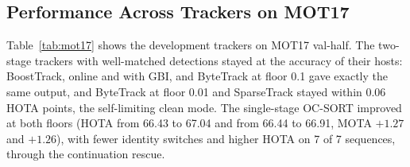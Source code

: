 \documentclass[pdflatex,sn-mathphys-num,iicol]{sn-jnl}
\begin{document}
\subsection{Performance Across Trackers on MOT17}\label{sec:tracker}
Table~\ref{tab:mot17} shows the development trackers on MOT17 val-half. The two-stage trackers with
well-matched detections stayed at the accuracy of their hosts: BoostTrack, online and with GBI, and
ByteTrack at floor 0.1 gave exactly the same output, and ByteTrack at floor 0.01 and SparseTrack
stayed within 0.06 HOTA points, the self-limiting clean mode. The single-stage OC-SORT improved at
both floors (HOTA from 66.43 to 67.04 and from 66.44 to 66.91, MOTA $+1.27$ and $+1.26$), with fewer identity switches and
higher HOTA on 7 of 7 sequences, through the continuation rescue.

\end{document}
